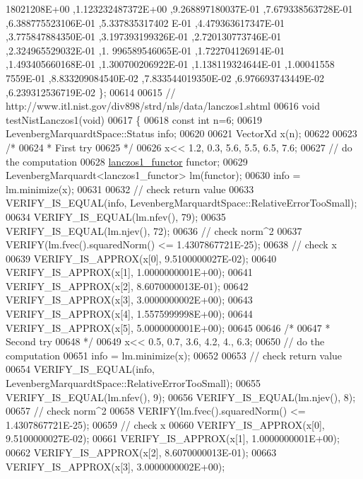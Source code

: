 \begin{DoxyCode}
      18021208E+00 ,1.123232487372E+00 ,9.268897180037E-01 ,7.679338563728E-01 ,6.388775523106E-01 ,5.337835317402
      E-01 ,4.479363617347E-01 ,3.775847884350E-01 ,3.197393199326E-01 ,2.720130773746E-01 ,2.324965529032E-01 ,1.
      996589546065E-01 ,1.722704126914E-01 ,1.493405660168E-01 ,1.300700206922E-01 ,1.138119324644E-01 ,1.00041558
      7559E-01 ,8.833209084540E-02 ,7.833544019350E-02 ,6.976693743449E-02 ,6.239312536719E-02 \};
00614 
00615 \textcolor{comment}{// http://www.itl.nist.gov/div898/strd/nls/data/lanczos1.shtml}
00616 \textcolor{keywordtype}{void} testNistLanczos1(\textcolor{keywordtype}{void})
00617 \{
00618   \textcolor{keyword}{const} \textcolor{keywordtype}{int} n=6;
00619   LevenbergMarquardtSpace::Status info;
00620 
00621   VectorXd x(n);
00622 
00623   \textcolor{comment}{/*}
00624 \textcolor{comment}{   * First try}
00625 \textcolor{comment}{   */}
00626   x<< 1.2, 0.3, 5.6, 5.5, 6.5, 7.6;
00627   \textcolor{comment}{// do the computation}
00628   \hyperlink{structlanczos1__functor}{lanczos1\_functor} functor;
00629   LevenbergMarquardt<lanczos1\_functor> lm(functor);
00630   info = lm.minimize(x);
00631 
00632   \textcolor{comment}{// check return value}
00633   VERIFY\_IS\_EQUAL(info, LevenbergMarquardtSpace::RelativeErrorTooSmall);
00634   VERIFY\_IS\_EQUAL(lm.nfev(), 79);
00635   VERIFY\_IS\_EQUAL(lm.njev(), 72);
00636   \textcolor{comment}{// check norm^2}
00637   VERIFY(lm.fvec().squaredNorm() <= 1.4307867721E-25);
00638   \textcolor{comment}{// check x}
00639   VERIFY\_IS\_APPROX(x[0], 9.5100000027E-02);
00640   VERIFY\_IS\_APPROX(x[1], 1.0000000001E+00);
00641   VERIFY\_IS\_APPROX(x[2], 8.6070000013E-01);
00642   VERIFY\_IS\_APPROX(x[3], 3.0000000002E+00);
00643   VERIFY\_IS\_APPROX(x[4], 1.5575999998E+00);
00644   VERIFY\_IS\_APPROX(x[5], 5.0000000001E+00);
00645 
00646   \textcolor{comment}{/*}
00647 \textcolor{comment}{   * Second try}
00648 \textcolor{comment}{   */}
00649   x<< 0.5, 0.7, 3.6, 4.2, 4., 6.3;
00650   \textcolor{comment}{// do the computation}
00651   info = lm.minimize(x);
00652 
00653   \textcolor{comment}{// check return value}
00654   VERIFY\_IS\_EQUAL(info, LevenbergMarquardtSpace::RelativeErrorTooSmall);
00655   VERIFY\_IS\_EQUAL(lm.nfev(), 9);
00656   VERIFY\_IS\_EQUAL(lm.njev(), 8);
00657   \textcolor{comment}{// check norm^2}
00658   VERIFY(lm.fvec().squaredNorm() <= 1.4307867721E-25);
00659   \textcolor{comment}{// check x}
00660   VERIFY\_IS\_APPROX(x[0], 9.5100000027E-02);
00661   VERIFY\_IS\_APPROX(x[1], 1.0000000001E+00);
00662   VERIFY\_IS\_APPROX(x[2], 8.6070000013E-01);
00663   VERIFY\_IS\_APPROX(x[3], 3.0000000002E+00);

\end{DoxyCode}
